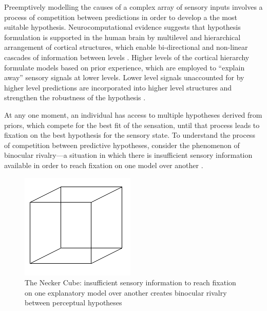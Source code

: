 \begin{CJK}{UTF8}{gbsn}
Preemptively modelling the causes of a complex array of sensory inputs involves a process of competition between predictions in order to develop a the most suitable hypothesis.  Neurocomputational evidence suggests that hypothesis formulation is supported in the human brain by multilevel and hierarchical arrangement of cortical structures, which enable bi-directional and non-linear cascades of information between levels \citep{Feldman2010}.  Higher levels of the cortical hierarchy formulate models based on prior experience, which are employed to ``explain away'' sensory signals at lower levels.  Lower level signals unaccounted for by higher level predictions are incorporated into higher level structures and strengthen the robustness of the hypothesis \citep{Clark2013}.

At any one moment, an individual has access to multiple hypotheses derived from priors, which compete for the best fit of the sensation, until that process leads to fixation on the best hypothesis for the sensory state.  To understand the process of competition between predictive hypotheses, consider the phenomenon of binocular rivalry---a situation in which there is insufficient sensory information available in order to reach fixation on one model over another \citep[for example, looking at a necker cube, see Figure ~\ref{fig:neckerCube}][]{Frith2007}.

\begin{figure}[htbp]
  \begin{center}
    \includegraphics[scale=.7]{images/Necker_cube.png}
      \caption{The Necker Cube: insufficient sensory information to reach fixation on one explanatory model over another creates binocular rivalry between perceptual hypotheses}
        \label{fig:neckerCube}
   \end{center}
\end{figure}


\end{CJK}
